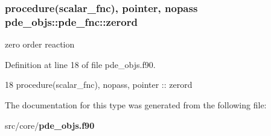 \subsubsection[{zerord}]{\setlength{\rightskip}{0pt plus 5cm}procedure({\bf scalar\+\_\+fnc}), pointer, nopass pde\+\_\+objs\+::pde\+\_\+fnc\+::zerord}\label{structpde__objs_1_1pde__fnc_ad352008050047415618cf592bf472fdc}


zero order reaction 



Definition at line 18 of file pde\+\_\+objs.\+f90.


\begin{DoxyCode}
18     \textcolor{keywordtype}{procedure}(scalar_fnc), \textcolor{keywordtype}{nopass}, \textcolor{keywordtype}{pointer}           :: zerord
\end{DoxyCode}


The documentation for this type was generated from the following file\+:\begin{DoxyCompactItemize}
\item 
src/core/{\bf pde\+\_\+objs.\+f90}\end{DoxyCompactItemize}
